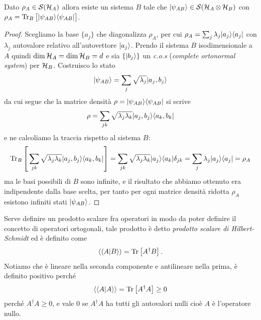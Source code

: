 \begin{theorem}[  ]
  Dato $ \rho_A \in \mathcal{S}(\operatorname{\mathcal{H}}_A) $ allora esiste un sistema $ B $ tale che $ \vert \psi_{AB} \rangle \in \mathcal{S}(\operatorname{\mathcal{H}}_A \otimes \operatorname{\mathcal{H}}_B) $ con 
  $ \rho_A = \Tr_B \left[ \phb\k{\psi_{AB}} \b{\psi_{AB}} \right] $.
\end{theorem}
\begin{proof}
  Scegliamo la base $ \{a_j\} $ che diagonalizza $ \rho_A $, per cui $ \rho_A = \sum_j \lambda_j \vert a_j \rangle \langle a_j \vert $ con $ \lambda_j $ autovalore 
  relativo all'autovettore $ \vert a_j \rangle $. 
  Prendo il sistema $ B $ isodimensionale a $ A $ quindi $ \dim \operatorname{\mathcal{H}}_A = \dim \operatorname{\mathcal{H}}_B = d $ e sia $ \{\vert b_j \rangle\} $ un \textit{c.o.s}
  (\textit{complete ortonormal system}) per $ \operatorname{\mathcal{H}}_B $. Costruisco lo stato 
  \begin{align*}
  \vert \psi_{AB} \rangle = \sum_{j} \sqrt{\lambda_j} \vert a_j, b_j \rangle
  \end{align*}
  da cui segue che la matrice densità $ \rho = \vert \psi_{AB} \rangle \langle \psi_{AB} \vert $ si scrive 
  \begin{align*}
    \rho = \sum_{jk} \sqrt{\lambda_j \lambda_k} \vert a_j,b_j \rangle \langle a_k, b_k \vert
  \end{align*}
  e ne calcoliamo la traccia rispetto al sistema $ B $:
  \begin{align*}
    \Tr_B\left[ \phb \sum_{jk} \sqrt{\lambda_j \lambda_k} \k{a_j,b_j} \b{a_k, b_k} \right] 
    = \sum_{jk}\sqrt{\lambda_j \lambda_k} \k{a_j} \b{a_k} \delta_{jk} = \sum_{j} \lambda_j \k{a_j} \b{a_j} = \rho_A
  \end{align*}
  ma le basi possibili di $ B $ sono infinite, e il risultato che abbiamo ottenuto era indipendente dalla base scelta, per tanto per ogni matrice densità 
  ridotta $ \rho_A $ esistono infiniti stati $ \vert \psi_{AB} \rangle $.
\end{proof}

Serve definire un prodotto scalare fra operatori in modo da poter definire il concetto di operatori ortogonali, tale prodotto è detto 
\textit{prodotto scalare di Hilbert-Schmidt} ed è definito come 
\begin{align*}
  \langle \langle A | B \rangle \rangle = \operatorname{\textnormal{Tr}}\left[ A^\dag B \right].
\end{align*}
Notiamo che è lineare nella seconda componente e antilineare nella prima, è definito positivo perché 
\begin{align*}
  \langle \langle A|A \rangle \rangle = \operatorname{\textnormal{Tr}}\left[ A^\dag A \right] \geq 0
\end{align*}
perché $ A^\dag A \geq 0 $, e vale $ 0 $ se $ A^\dag A $ ha tutti gli autovalori nulli cioè $ A $ è l'operatore nullo. 

